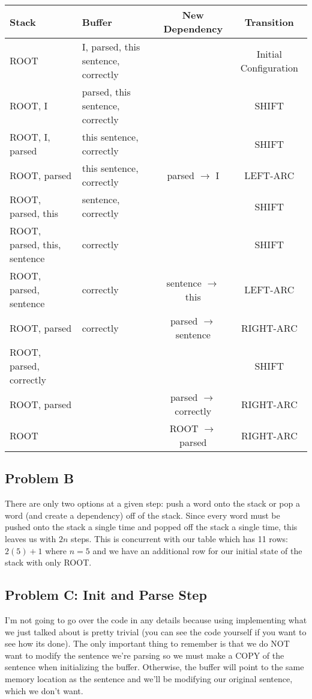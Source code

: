 \documentclass[12pt]{article}
\begin{document}
\bigskip
\scriptsize
\addtolength{\tabcolsep}{-1pt}
\begin{tabular}{l|l|c|c}
    Stack & Buffer & New Dependency & Transition \\
    \hline
    ROOT & I, parsed, this sentence, correctly && Initial Configuration \\
    ROOT, I & parsed, this sentence, correctly && SHIFT \\
    ROOT, I, parsed & this sentence, correctly && SHIFT \\
    ROOT, parsed & this sentence, correctly & parsed $\rightarrow$ I & LEFT-ARC \\
    ROOT, parsed, this & sentence, correctly  && SHIFT \\
    ROOT, parsed, this, sentence & correctly && SHIFT \\
    ROOT, parsed, sentence & correctly & sentence $\rightarrow$ this & LEFT-ARC \\
    ROOT, parsed & correctly & parsed $\rightarrow$ sentence & RIGHT-ARC \\
    ROOT, parsed, correctly &&& SHIFT \\
    ROOT, parsed && parsed $\rightarrow$ correctly & RIGHT-ARC \\
    ROOT && ROOT $\rightarrow$ parsed & RIGHT-ARC \\
\end{tabular}

\normalsize
\subsection{Problem B}
There are only two options at a given step: push a word onto the stack or pop 
a word (and create a dependency) off of the stack. Since every word must be 
pushed onto the stack a single time and popped off the stack a single time, 
this leaves us with $2n$ steps. This is concurrent with our table which has 
11 rows: $2(5) + 1$ where $n = 5$ and we have an additional row for our 
initial state of the stack with only ROOT. 

\subsection{Problem C: Init and Parse Step}
I'm not going to go over the code in any details because using implementing 
what we just talked about is pretty trivial (you can see the code yourself 
if you want to see how its done). The only important thing to remember is 
that we do NOT want to modify the sentence we're parsing so we must make 
a COPY of the sentence when initializing the buffer. Otherwise, the buffer 
will point to the same memory location as the sentence and we'll be modifying 
our original sentence, which we don't want. 
\end{document}

